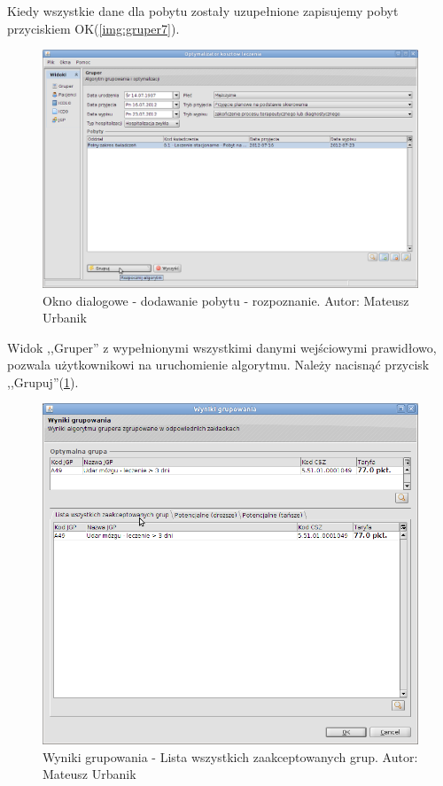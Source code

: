 Kiedy wszystkie dane dla pobytu zostały uzupełnione zapisujemy pobyt przyciskiem OK(\ref{img:gruper7}).

\begin{figure}%
\centering
\includegraphics[scale=0.4]{images/gruper8}
\caption[Widok grupera]{Okno dialogowe - dodawanie pobytu - rozpoznanie. Autor: Mateusz Urbanik}
\label{img:gruper8}
\end{figure}

Widok ,,Gruper'' z wypełnionymi wszystkimi danymi wejściowymi prawidłowo, pozwala użytkownikowi na uruchomienie algorytmu. Należy nacisnąć przycisk ,,Grupuj''(\ref{img:gruper8}).

\begin{figure}%
\centering
\includegraphics[scale=0.4]{images/gruper9}
\caption[Widok grupera]{Wyniki grupowania - Lista wszystkich zaakceptowanych grup. Autor: Mateusz Urbanik}
\label{img:gruper9}
\end{figure}

